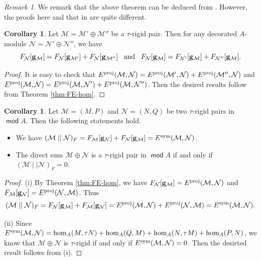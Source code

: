 \documentclass[10pt]{amsart}
\theoremstyle{definition}
\newtheorem{corollary}[theorem]{Corollary}
\theoremstyle{remark}
\newtheorem{remark}[theorem]{Remark}
\numberwithin{equation}{section}
\def\mod{\opname{mod}\nolimits}
\newcommand{\opname}[1]{\operatorname{\mathsf{#1}}}
\begin{document}
\begin{remark}
  We remark that the above theorem can be deduced from \cite[Theorem 3.6]{fei_2019b}. However, the proofs here and that in \cite{fei_2019b} are quite different.
\end{remark}

\begin{corollary}\label{cor:additive}
Let $\mathcal M=\mathcal M'\oplus \mathcal M''$ be a $\tau$-rigid pair. Then for any decorated $A$-module $\mathcal N=\mathcal N'\oplus \mathcal N''$, we have
\[ F_{\mathcal N}[{\bf g}_{\mathcal M}]=F_{\mathcal N}[{\bf g}_{\mathcal M'}]+F_{\mathcal N}[{\bf g}_{\mathcal M''}]\;\;\;\text{and}\;\;\;F_{\mathcal N}[{\bf g}_{\mathcal M}]=F_{\mathcal N'}[{\bf g}_{\mathcal M}]+F_{\mathcal N''}[{\bf g}_{\mathcal M}].
\]
\end{corollary}
\begin{proof}
It is easy to check that $E^{\rm proj}(\mathcal M, \mathcal N)=E^{\rm proj}(\mathcal M', \mathcal N)+E^{\rm proj}(\mathcal M'', \mathcal N)$ and $E^{\rm proj}(\mathcal M, \mathcal N)=E^{\rm proj}(\mathcal M, \mathcal N')+E^{\rm proj}(\mathcal M, \mathcal N'')$. Then the desired results follow from Theorem \ref{thm:FE-hom}.  
\end{proof}

\begin{corollary}\label{cor-F=E}
Let $\mathcal M=(M,P)$ and $\mathcal N=(N,Q)$ be two $\tau$-rigid pairs in  $\mod A$. Then the following statements hold.
\begin{itemize}
    \item [(i)] We have $(\mathcal M\mid\mid \mathcal N)_F=F_{\mathcal M}[{\bf g}_{\mathcal N}]+F_{\mathcal N}[{\bf g}_{\mathcal M}]=E^{\rm sym}(\mathcal M,\mathcal N)$.
    \item[(ii)] The direct sum $\mathcal M\oplus \mathcal N$ is a $\tau$-rigid pair in $\mod A$ if and only if $(\mathcal M\mid\mid \mathcal N)_F=0$.
\end{itemize}
\end{corollary}
\begin{proof}
 (i) By Theorem \ref{thm:FE-hom}, we have $F_{\mathcal N}[{\bf g}_{\mathcal M}]=E^{\rm proj}(\mathcal M,\mathcal N)$ and $F_{\mathcal M}[{\bf g}_{\mathcal N}]=E^{\rm proj}(\mathcal N, \mathcal M)$. Thus 
 \[(\mathcal M\mid\mid \mathcal N)_F=F_{\mathcal N}[{\bf g}_{\mathcal M}]+F_{\mathcal M}[{\bf g}_{\mathcal N}]=E^{\rm proj}(\mathcal M,\mathcal N)+E^{\rm proj}(\mathcal N,\mathcal M) =E^{\rm sym}(\mathcal M,\mathcal N).\]

 (ii) Since $E^{\rm sym}(\mathcal M,\mathcal N)=\hom_A(M,\tau N)+\hom_A(Q,M)+\hom_A(N,\tau M)+\hom_A(P,N)$, we know that $\mathcal M\oplus \mathcal N$ is $\tau$-rigid if and only if $E^{\rm sym}(\mathcal M,\mathcal N)=0$. Then the desirted result follows from (i).
\end{proof}
\end{document}
